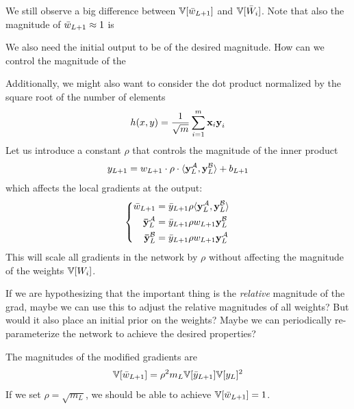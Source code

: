 We still observe a big difference between $\mathbb{V}[\bar{w}_{L+1}]$ and $\mathbb{V}[\bar{W}_{i}]$.
Note that also the magnitude of $\bar{w}_{L+1} \approx 1$ is 

We also need the initial output to be of the desired magnitude.
How can we control the magnitude of the 

\vspace{2em}

Additionally, we might also want to consider the dot product normalized by the square root of the number of elements
\begin{equation}
h(x, y) = \frac{1}{\sqrt{m}} \sum_{i = 1}^{m} \boldsymbol{\mathbf{x}}_{i} \boldsymbol{\mathbf{y}}_{i}
\end{equation}
Let us introduce a constant $\rho$ that controls the magnitude of the inner product
\begin{equation}
y_{L+1} = w_{L+1} \cdot \rho \cdot \langle \boldsymbol{\mathbf{y}}_{L}^{\mathcal{A}},  \boldsymbol{\mathbf{y}}_{L}^{\mathcal{B}} \rangle + b_{L+1}
\end{equation}
which affects the local gradients at the output:
\begin{equation}
\left\{ \begin{aligned}
\bar{w}_{L+1} & = \bar{y}_{L+1} \rho \langle \boldsymbol{\mathbf{y}}_{L}^{\mathcal{A}}, \boldsymbol{\mathbf{y}}_{L}^{\mathcal{B}} \rangle \\
\boldsymbol{\mathbf{\bar{y}}}_{L}^{\mathcal{A}} & = \bar{y}_{L+1} \rho w_{L+1} \boldsymbol{\mathbf{y}}_{L}^{\mathcal{B}} \\
\boldsymbol{\mathbf{\bar{y}}}_{L}^{\mathcal{B}} & = \bar{y}_{L+1} \rho w_{L+1} \boldsymbol{\mathbf{y}}_{L}^{\mathcal{A}}
\end{aligned} \right.
\end{equation}
This will scale all gradients in the network by $\rho$ without affecting the magnitude of the weights $\mathbb{V}[W_{i}]$.

If we are hypothesizing that the important thing is the \emph{relative} magnitude of the grad, maybe we can use this to adjust the relative magnitudes of all weights?
But would it also place an initial prior on the weights?
Maybe we can periodically re-parameterize the network to achieve the desired properties?

The magnitudes of the modified gradients are
\begin{align}
\mathbb{V}[\bar{w}_{L+1}] = \rho^{2} m_{L} \mathbb{V}[\bar{y}_{L+1}] \mathbb{V}[y_{L}]^{2}
\end{align}
If we set $\rho = \sqrt{m_{L}}$, we should be able to achieve $\mathbb{V}[\bar{w}_{L+1}] = 1$.



